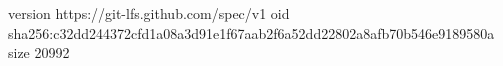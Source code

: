 version https://git-lfs.github.com/spec/v1
oid sha256:c32dd244372cfd1a08a3d91e1f67aab2f6a52dd22802a8afb70b546e9189580a
size 20992
